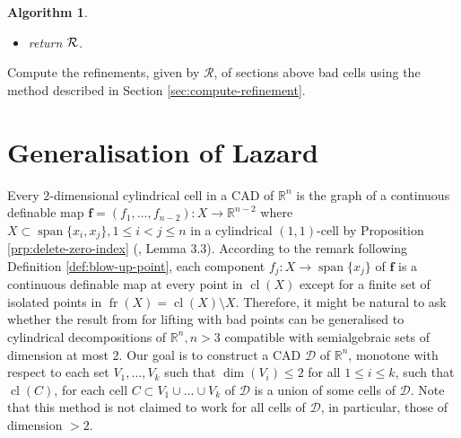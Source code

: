 \documentclass[
]{book}
\newtheorem{algorithm}{Algorithm}
\theoremstyle{definition}
\theoremstyle{definition}
\theoremstyle{definition}
\theoremstyle{definition}
\theoremstyle{remark}
\begin{document}
\begin{algorithm}
\begin{itemize}
\begin{itemize}
    \begin{itemize}
    \item
      If \(g \in \mathbb{Q}[x_1]\), then \(h := g_2\). Otherwise, \(g \in \mathbb{Q}[x_1,x_2]\) and \(h := g_1\).
    \item
      Define the saturation
      \[
      I := \langle f, g, 1 - z h \rangle \cap \mathbb{Q}[x_1,x_2,x_3],
      \]
      where \(z\) is a new variable.
    \item
      Compute a generator system \(S\), i.e., a Groebner basis for the ideal \(I\).
    \item
      Compute
      \[
      L := \{ {\mathrm{sub}}_{\mathbf{b}}(f') \in \mathbb{Q}[x_3] \mid f' \in S \}
      \]
      and find the real roots
      \[
      (c_1,\ldots,c_t)
      \]
      of \(L\).
    \item
      Let
      \[
      {\cal R} := {\cal R} \cup \{ {\cal R}_{\mathbf{b}} = (c_1,\ldots,c_t) \}.
      \]
    \end{itemize}
  \end{itemize}
\item
  return \(\cal R\).
\end{itemize}

\end{algorithm}

Compute the refinements, given by \(\mathcal{R}\), of sections above bad cells using the method described in Section \ref{sec:compute-refinement}.

\hypertarget{sec:lazard-n}{%
\section{Generalisation of Lazard}\label{sec:lazard-n}}

Every \(2\)-dimensional cylindrical cell in a CAD of \(\mathbb{R}^n\) is the graph of a continuous definable map \(\mathbf{f} = (f_1,\ldots,f_{n-2}) : X \to \mathbb{R}^{n-2}\) where \(X \subset {\operatorname{span} \{x_i,x_j\}}, 1 \le i < j \le n\) in a cylindrical
\((1,1)\)-cell by Proposition \ref{prp:delete-zero-index} (\citet{bgv13}, Lemma 3.3). According to the remark following
Definition \ref{def:blow-up-point}, each component \(f_j : X \to {\operatorname{span} \{x_j\}}\) of \(\mathbf{f}\) is a continuous definable map at every point in \({\operatorname{cl} \left( X \right)}\) except for a finite set of isolated points in \({\operatorname{fr} \left( X \right)} = {\operatorname{cl} \left( X \right)} \setminus X\).
Therefore, it might be natural to ask whether the result from \citet{lazard10} for lifting with bad points can be generalised to cylindrical decompositions of \(\mathbb{R}^n, n > 3\) compatible with semialgebraic sets of dimension at most \(2\).
Our goal is to construct a CAD \(\mathcal{D}\) of \(\mathbb{R}^n\), monotone with respect to each set \(V_1, \ldots, V_k\) such that \(\dim(V_i) \le 2\) for all \(1 \le i \le k\), such that \({\operatorname{cl} \left( C \right)}\), for each cell \(C \subset V_1 \cup \ldots \cup V_k\) of \(\mathcal{D}\) is a union of some cells of \(\mathcal{D}\).
Note that this method is not claimed to work for all cells of \(\mathcal{D}\), in particular, those of dimension \(> 2\).
\end{document}
